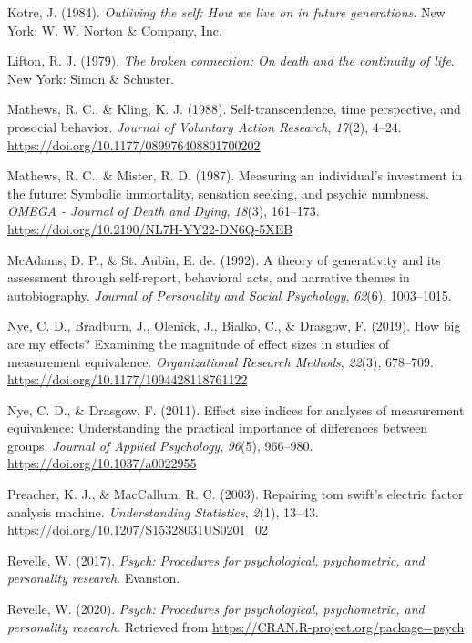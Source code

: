 \documentclass[
  english,
  man]{apa6}
\newlength{\cslhangindent}
\newenvironment{CSLReferences}[2] %
 {\begin{list}{}{%
  \setlength{\itemindent}{0pt}
  \setlength{\leftmargin}{0pt}
  \setlength{\parsep}{0pt}
  \ifodd #1
   \setlength{\leftmargin}{\cslhangindent}
   \setlength{\itemindent}{-1\cslhangindent}
  \fi
  \setlength{\itemsep}{#2\baselineskip}}}
 {\end{list}}
\begin{document}
\begin{CSLReferences}{1}{0}
Kotre, J. (1984). \emph{Outliving the self: How we live on in future generations}. New York: W. W. Norton \& Company, Inc.

Lifton, R. J. (1979). \emph{The broken connection: On death and the continuity of life}. New York: Simon \& Schuster.

Mathews, R. C., \& Kling, K. J. (1988). Self-transcendence, time perspective, and prosocial behavior. \emph{Journal of Voluntary Action Research}, \emph{17}(2), 4--24. \url{https://doi.org/10.1177/089976408801700202}

Mathews, R. C., \& Mister, R. D. (1987). Measuring an individual's investment in the future: Symbolic immortality, sensation seeking, and psychic numbness. \emph{OMEGA - Journal of Death and Dying}, \emph{18}(3), 161--173. \url{https://doi.org/10.2190/NL7H-YY22-DN6Q-5XEB}

McAdams, D. P., \& St. Aubin, E. de. (1992). A theory of generativity and its assessment through self-report, behavioral acts, and narrative themes in autobiography. \emph{Journal of Personality and Social Psychology}, \emph{62}(6), 1003--1015.

Nye, C. D., Bradburn, J., Olenick, J., Bialko, C., \& Drasgow, F. (2019). How big are my effects? Examining the magnitude of effect sizes in studies of measurement equivalence. \emph{Organizational Research Methods}, \emph{22}(3), 678--709. \url{https://doi.org/10.1177/1094428118761122}

Nye, C. D., \& Drasgow, F. (2011). Effect size indices for analyses of measurement equivalence: Understanding the practical importance of differences between groups. \emph{Journal of Applied Psychology}, \emph{96}(5), 966--980. \url{https://doi.org/10.1037/a0022955}

Preacher, K. J., \& MacCallum, R. C. (2003). Repairing tom swift's electric factor analysis machine. \emph{Understanding Statistics}, \emph{2}(1), 13--43. \url{https://doi.org/10.1207/S15328031US0201_02}

Revelle, W. (2017). \emph{Psych: Procedures for psychological, psychometric, and personality research}. Evanston.

Revelle, W. (2020). \emph{Psych: Procedures for psychological, psychometric, and personality research}. Retrieved from \url{https://CRAN.R-project.org/package=psych}


\end{CSLReferences}
\end{document}
